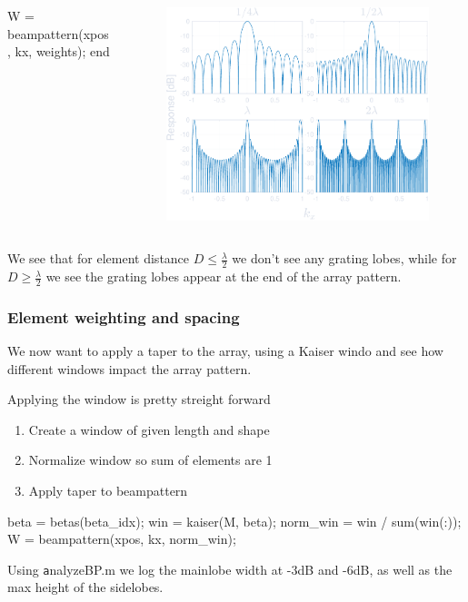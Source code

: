 \documentclass[compress]{beamer}
\begin{document}
\begin{frame}[fragile]
\begin{columns}
\begin{column}{0.52\textwidth}
\begin{jllisting}[gobble=16, language=Matlab]
                    W = beampattern(xpos, kx, weights);
                end
            \end{jllisting}
        \end{column}
        \begin{column}{0.5\textwidth}
            \begin{figure}
                \includegraphics[width=\columnwidth]{"../4.pdf"}
            \end{figure}
        \end{column}
    \end{columns}
    We see that for element distance $D \le \frac{λ}{2}$ we don't see any grating lobes,
    while for $D \ge \frac{λ}{2}$ we see the grating lobes appear at the end of the array
    pattern.
\end{frame}

\begin{frame}[fragile] %
    \frametitle{Element weighting and spacing}
    We now want to apply a taper to the array, using a Kaiser windo and see how
    different windows impact the array pattern.
    
    Applying the window is pretty streight forward
    \begin{enumerate}
        \item Create a window of given length and shape
        \item Normalize window so sum of elements are 1
        \item Apply taper to beampattern
    \end{enumerate}

    \begin{jllisting}[gobble=8,language=Matlab]
        beta = betas(beta_idx);
        win = kaiser(M, beta);
        norm_win = win / sum(win(:));
        W = beampattern(xpos, kx, norm_win);
    \end{jllisting}
    Using {\texttt analyzeBP.m} we log the mainlobe width at -3dB and -6dB, as
    well as the max height of the sidelobes.
\end{frame}
\end{document}
